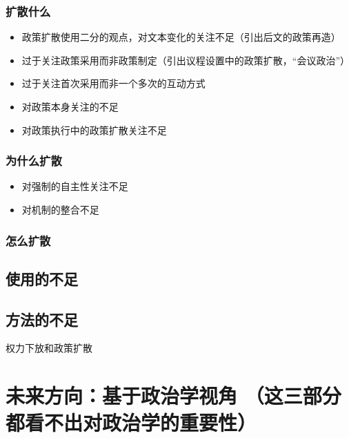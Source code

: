 \documentclass[
  12pt,
]{ctexart}
\begin{document}
\hypertarget{ux6269ux6563ux4ec0ux4e48}{%
\subsubsection{扩散什么}\label{ux6269ux6563ux4ec0ux4e48}}

\begin{itemize}
\item
  政策扩散使用二分的观点，对文本变化的关注不足（引出后文的政策再造）
\item
  过于关注政策采用而非政策制定（引出议程设置中的政策扩散，``会议政治''）
\item
  过于关注首次采用而非一个多次的互动方式
\item
  对政策本身关注的不足
\item
  对政策执行中的政策扩散关注不足
\end{itemize}

\hypertarget{ux4e3aux4ec0ux4e48ux6269ux6563}{%
\subsubsection{为什么扩散}\label{ux4e3aux4ec0ux4e48ux6269ux6563}}

\begin{itemize}
\item
  对强制的自主性关注不足
\item
  对机制的整合不足
\end{itemize}

\hypertarget{ux600eux4e48ux6269ux6563}{%
\subsubsection{怎么扩散}\label{ux600eux4e48ux6269ux6563}}

\hypertarget{ux4f7fux7528ux7684ux4e0dux8db3}{%
\subsection{使用的不足}\label{ux4f7fux7528ux7684ux4e0dux8db3}}

\hypertarget{ux65b9ux6cd5ux7684ux4e0dux8db3}{%
\subsection{方法的不足}\label{ux65b9ux6cd5ux7684ux4e0dux8db3}}

权力下放和政策扩散

\hypertarget{ux672aux6765ux65b9ux5411ux57faux4e8eux653fux6cbbux5b66ux89c6ux89d2-ux8fd9ux4e09ux90e8ux5206ux90fdux770bux4e0dux51faux5bf9ux653fux6cbbux5b66ux7684ux91cdux8981ux6027}{%
\section{未来方向：基于政治学视角 （这三部分都看不出对政治学的重要性）}\label{ux672aux6765ux65b9ux5411ux57faux4e8eux653fux6cbbux5b66ux89c6ux89d2-ux8fd9ux4e09ux90e8ux5206ux90fdux770bux4e0dux51faux5bf9ux653fux6cbbux5b66ux7684ux91cdux8981ux6027}}
\end{document}

